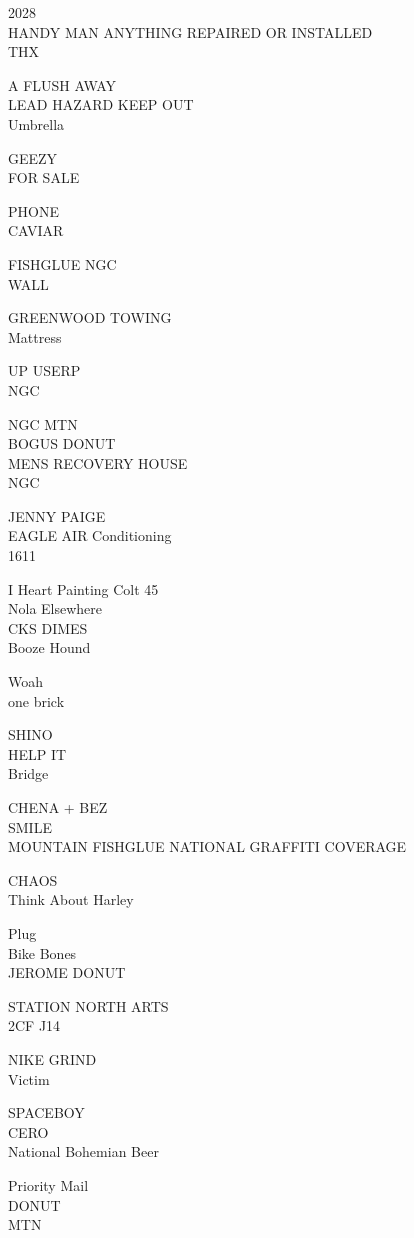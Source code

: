 \documentclass[10pt,letterpaper]{article}
\begin{document}
2028\\
HANDY MAN ANYTHING REPAIRED OR INSTALLED\\
THX

A FLUSH AWAY\\
LEAD HAZARD KEEP OUT\\
Umbrella

GEEZY\\
FOR SALE

PHONE\\
CAVIAR

FISHGLUE NGC\\
WALL

GREENWOOD TOWING\\
Mattress

UP USERP\\
NGC

NGC MTN\\
BOGUS DONUT\\
MENS RECOVERY HOUSE\\
NGC

JENNY PAIGE\\
EAGLE AIR Conditioning\\
1611

I Heart Painting Colt 45\\
Nola Elsewhere\\
CKS DIMES\\
Booze Hound

Woah\\
one brick

SHINO\\
HELP IT\\
Bridge

CHENA + BEZ\\
SMILE\\
MOUNTAIN FISHGLUE NATIONAL GRAFFITI COVERAGE

CHAOS\\
Think About Harley

Plug\\
Bike Bones\\
JEROME DONUT

STATION NORTH ARTS\\
2CF J14

NIKE GRIND\\
Victim

SPACEBOY\\
CERO\\
National Bohemian Beer

Priority Mail\\
DONUT\\
MTN
\end{document}

